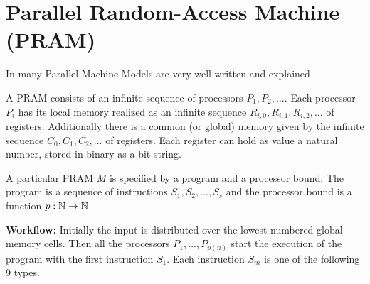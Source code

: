 \section{Parallel Random-Access Machine (\textsc{PRAM})}
In \cite{karpramachandran} many Parallel Machine Models are very well written and explained
\begin{definition}
	A \textsc{PRAM} consists of an infinite sequence of processors $P_1,P_2,\dots$. Each processor $P_i$ has its local memory realized as an infinite sequence $R_{i,0},R_{i,1},R_{i,2},\dots$ of registers. Additionally there is a common (or global) memory given by the infinite sequence $C_0,C_1,C_2,\dots$ of registers. Each register can hold as value a natural number, stored in binary as a bit string.
	
	A particular \textsc{PRAM} $M$ is specified by a program and a processor bound. The program is a sequence of instructions $S_1,S_2,\dots, S_s$ and the processor bound is a function $p:\mathbb{N}\to \mathbb{N}$
	
	\textbf{Workflow:} Initially the input is distributed over the lowest numbered global memory cells. Then all the processors $P_1,\dots,P_{p(n)}$ start the execution of the program with the first instruction $S_1$. Each instruction $S_m$ is one of the following 9 types. 
	

\end{definition}
